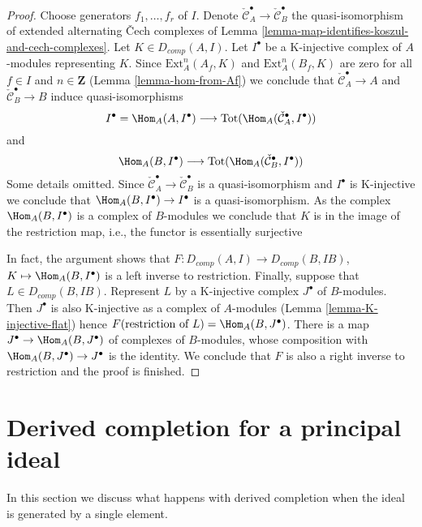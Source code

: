 \begin{proof}
Choose generators $f_1, \ldots, f_r$ of $I$.
Denote $\check{\mathcal{C}}^\bullet_A \to \check{\mathcal{C}}^\bullet_B$
the quasi-isomorphism of extended alternating {\v C}ech complexes of
Lemma \ref{lemma-map-identifies-koszul-and-cech-complexes}.
Let $K \in D_{comp}(A, I)$. Let $I^\bullet$ be a K-injective
complex of $A$-modules representing $K$. Since $\text{Ext}^n_A(A_f, K)$
and $\text{Ext}^n_A(B_f, K)$ are zero for all $f \in I$ and
$n \in \mathbf{Z}$ (Lemma \ref{lemma-hom-from-Af}) we conclude that
$\check{\mathcal{C}}^\bullet_A \to A$ and
$\check{\mathcal{C}}^\bullet_B \to B$ induce quasi-isomorphisms
$$
I^\bullet = \Hom_A(A, I^\bullet) \longrightarrow
\text{Tot}(\Hom_A(\check{\mathcal{C}}^\bullet_A, I^\bullet))
$$
and
$$
\Hom_A(B, I^\bullet) \longrightarrow
\text{Tot}(\Hom_A(\check{\mathcal{C}}^\bullet_B, I^\bullet))
$$
Some details omitted.
Since $\check{\mathcal{C}}^\bullet_A \to \check{\mathcal{C}}^\bullet_B$
is a quasi-isomorphism and $I^\bullet$ is K-injective we conclude
that $\Hom_A(B, I^\bullet) \to I^\bullet$ is a quasi-isomorphism.
As the complex $\Hom_A(B, I^\bullet)$ is a complex of $B$-modules
we conclude that $K$ is in the image of the restriction map, i.e.,
the functor is essentially surjective

\medskip\noindent
In fact, the argument shows that
$F : D_{comp}(A, I) \to D_{comp}(B, IB)$, $K \mapsto \Hom_A(B, I^\bullet)$
is a left inverse to restriction. Finally, suppose that
$L \in D_{comp}(B, IB)$. Represent $L$ by a K-injective complex
$J^\bullet$ of $B$-modules.
Then $J^\bullet$ is also K-injective as a complex of $A$-modules
(Lemma \ref{lemma-K-injective-flat}) hence
$F(\text{restriction of }L) = \Hom_A(B, J^\bullet)$.
There is a map $J^\bullet \to \Hom_A(B, J^\bullet)$
of complexes of $B$-modules, whose composition with
$\Hom_A(B, J^\bullet) \to J^\bullet$ is the identity.
We conclude that $F$ is also a right inverse to restriction
and the proof is finished.
\end{proof}





\section{Derived completion for a principal ideal}
\label{section-derived-completion-principal}

\noindent
In this section we discuss what happens with derived completion
when the ideal is generated by a single element.

